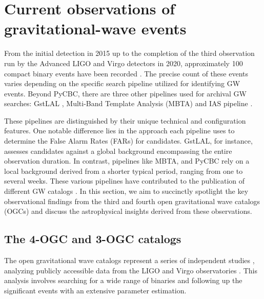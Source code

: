 \section{Current observations of gravitational-wave events}

From the initial detection in 2015 up to the completion of the third observation run by the Advanced LIGO and Virgo detectors in 2020, approximately 100 compact binary events have been recorded \cite{Nitz:2021zwj,LIGOScientific:2021djp,Olsen:2022pin}. The precise count of these events varies depending on the specific search pipeline utilized for identifying GW events. Beyond PyCBC, there are three other pipelines used for archival GW searches: GstLAL \cite{Messick:2016aqy, Cannon:2020qnf}, Multi-Band Template Analysis (MBTA) \cite{Adams:2015ulm,Aubin:2020goo} and IAS pipeline \cite{Olsen:2022pin,Mehta:2022pcn}. 

These pipelines are distinguished by their unique technical and configuration features. One notable difference lies in the approach each pipeline uses to determine the False Alarm Rates (FARs) for candidates. GstLAL, for instance, assesses candidates against a global background encompassing the entire observation duration. In contrast, pipelines like MBTA, and PyCBC rely on a local background derived from a shorter typical period, ranging from one to several weeks. These various pipelines have contributed to the publication of different GW catalogs \cite{Nitz:2021zwj,LIGOScientific:2021djp,Olsen:2022pin}. In this section, we aim to succinctly spotlight the key observational findings from the third and fourth open gravitational wave catalogs (OGCs) and discuss the astrophysical insights derived from these observations.

\subsection{The 4-OGC and 3-OGC catalogs}
The open gravitational wave catalogs represent a series of independent studies \cite{Nitz:2021uxj, Nitz:2021zwj}, analyzing publicly accessible data from the LIGO and Virgo observatories \cite{Vallisneri:2014vxa,Abbott:2019ebz}. This analysis involves searching for a wide range of binaries and following up the significant events with an extensive parameter estimation. 

